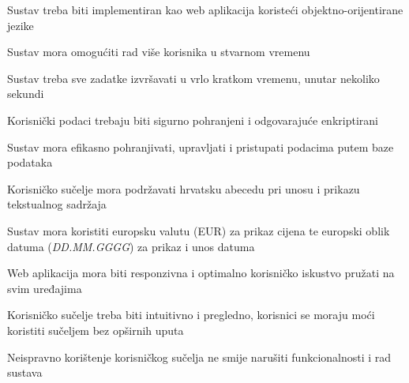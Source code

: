 			\begin{packed_item}
				\item Sustav treba biti implementiran kao web aplikacija koristeći objektno-orijentirane jezike 
				\item Sustav mora omogućiti rad više korisnika u stvarnom vremenu 
				\item Sustav treba sve zadatke izvršavati u vrlo kratkom vremenu, unutar nekoliko sekundi
				\item Korisnički podaci trebaju biti sigurno pohranjeni i odgovarajuće enkriptirani
				\item Sustav mora efikasno pohranjivati, upravljati i pristupati podacima putem baze podataka 
				\item Korisničko sučelje mora podržavati hrvatsku abecedu pri unosu i prikazu tekstualnog sadržaja
				\item Sustav mora koristiti europsku valutu (EUR) za prikaz cijena te europski oblik datuma (\textit{DD.MM.GGGG}) za prikaz i unos datuma
				\item Web aplikacija mora biti responzivna i optimalno korisničko iskustvo pružati na svim uređajima
				\item Korisničko sučelje treba biti intuitivno i pregledno, korisnici se moraju moći koristiti sučeljem bez opširnih uputa
				\item Neispravno korištenje korisničkog sučelja ne smije narušiti funkcionalnosti i rad sustava
				
				
			\end{packed_item}
			 
			 
	